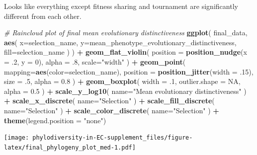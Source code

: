 \documentclass[]{book}
\newenvironment{Shaded}{\begin{snugshade}}{\end{snugshade}}
\newcommand{\CommentTok}[1]{\textcolor[rgb]{0.56,0.35,0.01}{\textit{#1}}}
\newcommand{\DataTypeTok}[1]{\textcolor[rgb]{0.13,0.29,0.53}{#1}}
\newcommand{\DecValTok}[1]{\textcolor[rgb]{0.00,0.00,0.81}{#1}}
\newcommand{\FloatTok}[1]{\textcolor[rgb]{0.00,0.00,0.81}{#1}}
\newcommand{\KeywordTok}[1]{\textcolor[rgb]{0.13,0.29,0.53}{\textbf{#1}}}
\newcommand{\NormalTok}[1]{#1}
\newcommand{\OperatorTok}[1]{\textcolor[rgb]{0.81,0.36,0.00}{\textbf{#1}}}
\newcommand{\OtherTok}[1]{\textcolor[rgb]{0.56,0.35,0.01}{#1}}
\newcommand{\StringTok}[1]{\textcolor[rgb]{0.31,0.60,0.02}{#1}}
\begin{document}
Looks like everything except fitness sharing and tournament are significantly different from each other.

\begin{Shaded}
\begin{Highlighting}[]
\CommentTok{# Raincloud plot of final mean evolutionary distinctiveness}
\KeywordTok{ggplot}\NormalTok{(}
\NormalTok{    final_data,}
    \KeywordTok{aes}\NormalTok{(}
      \DataTypeTok{x=}\NormalTok{selection_name,}
      \DataTypeTok{y=}\NormalTok{mean_phenotype_evolutionary_distinctiveness,}
      \DataTypeTok{fill=}\NormalTok{selection_name}
\NormalTok{    )}
\NormalTok{  ) }\OperatorTok{+}
\StringTok{  }\KeywordTok{geom_flat_violin}\NormalTok{(}
    \DataTypeTok{position =} \KeywordTok{position_nudge}\NormalTok{(}\DataTypeTok{x =} \FloatTok{.2}\NormalTok{, }\DataTypeTok{y =} \DecValTok{0}\NormalTok{),}
    \DataTypeTok{alpha =} \FloatTok{.8}\NormalTok{,}
    \DataTypeTok{scale=}\StringTok{"width"}
\NormalTok{  ) }\OperatorTok{+}
\StringTok{  }\KeywordTok{geom_point}\NormalTok{(}
    \DataTypeTok{mapping=}\KeywordTok{aes}\NormalTok{(}\DataTypeTok{color=}\NormalTok{selection_name),}
    \DataTypeTok{position =} \KeywordTok{position_jitter}\NormalTok{(}\DataTypeTok{width =} \FloatTok{.15}\NormalTok{),}
    \DataTypeTok{size =} \FloatTok{.5}\NormalTok{,}
    \DataTypeTok{alpha =} \FloatTok{0.8}
\NormalTok{  ) }\OperatorTok{+}
\StringTok{  }\KeywordTok{geom_boxplot}\NormalTok{(}
    \DataTypeTok{width =} \FloatTok{.1}\NormalTok{,}
    \DataTypeTok{outlier.shape =} \OtherTok{NA}\NormalTok{,}
    \DataTypeTok{alpha =} \FloatTok{0.5}
\NormalTok{  ) }\OperatorTok{+}
\StringTok{  }\KeywordTok{scale_y_log10}\NormalTok{(}
    \DataTypeTok{name=}\StringTok{"Mean evolutionary distinctiveness"}
\NormalTok{  ) }\OperatorTok{+}
\StringTok{  }\KeywordTok{scale_x_discrete}\NormalTok{(}
    \DataTypeTok{name=}\StringTok{"Selection"}
\NormalTok{  ) }\OperatorTok{+}
\StringTok{  }\KeywordTok{scale_fill_discrete}\NormalTok{(}
    \DataTypeTok{name=}\StringTok{"Selection"}
\NormalTok{  ) }\OperatorTok{+}
\StringTok{  }\KeywordTok{scale_color_discrete}\NormalTok{(}
    \DataTypeTok{name=}\StringTok{"Selection"}
\NormalTok{  ) }\OperatorTok{+}\StringTok{ }
\StringTok{  }\KeywordTok{theme}\NormalTok{(}\DataTypeTok{legend.position =} \StringTok{"none"}\NormalTok{)}
\end{Highlighting}
\end{Shaded}

\texttt{[image: phylodiversity-in-EC-supplement\_files/figure-latex/final\_phylogeny\_plot\_med-1.pdf]}
\end{document}
